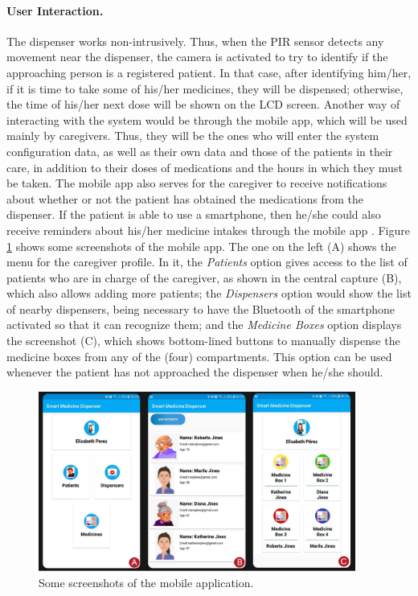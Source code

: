\documentclass{IOS-Book-Article}
\begin{document}
\paragraph{User Interaction. }
The dispenser works non-intrusively. Thus, when the PIR sensor detects any movement near the dispenser, the camera is activated to try to identify if the approaching person is a registered patient. In that case, after identifying him/her, if it is time to take some of his/her medicines, they will be dispensed; otherwise, the time of his/her next dose will be shown on the LCD screen. Another way of interacting with the system would be through the mobile app, which will be used mainly by caregivers. Thus, they will be the ones who will enter the system configuration data, as well as their own data and those of the patients in their care, in addition to their doses of medications and the hours in which they must be taken. The mobile app also serves for the caregiver to receive notifications about whether or not the patient has obtained the medications from the dispenser. If the patient is able to use a smartphone, then he/she could also receive reminders about his/her medicine intakes through the mobile app \cite{r7,r19}. Figure \ref{figures:AppMovil} shows some screenshots of the mobile app. The one on the left (A) shows the menu for the caregiver profile. In it, the \textit{Patients} option gives access to the list of patients who are in charge of the caregiver, as shown in the central capture (B), which also allows adding more patients; the \textit{Dispensers} option would show the list of nearby dispensers, being necessary to have the Bluetooth of the smartphone activated so that it can recognize them; and the \textit{Medicine Boxes} option displays the screenshot (C), which shows bottom-lined buttons to manually dispense the medicine boxes from any of the (four) compartments. This option can be used whenever the patient has not approached the dispenser when he/she should.

\begin{figure}[htb]
	\centering\includegraphics[width=0.93\textwidth]{AppMovilDispenser.png}
	\caption{Some screenshots of the mobile application.}
	\label{figures:AppMovil}
\end{figure}
\end{document}
